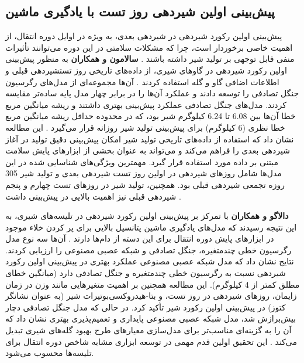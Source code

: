 \subsection*{پیش‌بینی اولین شیردهی روز تست  با یادگیری ماشین}	
پیش‌بینی اولین رکورد شیردهی در شیردهی بعدی، به ویژه در اوایل دوره انتقال، از اهمیت خاصی برخوردار است، چرا که مشکلات سلامتی در این دوره می‌توانند تأثیرات منفی قابل توجهی بر تولید شیر داشته باشند \cite{Dallago2019}.
	\textbf{سالامون و همکاران} به منظور پیش‌بینی اولین رکورد شیردهی در گاوهای شیری، از داده‌های تاریخی روز تستشیردهی قبلی  و اطلاعات اضافی گاو و گله استفاده کردند \cite{Salamone2022}.
آن‌ها مجموعه‌ای از مدل‌های رگرسیون جنگل تصادفی را توسعه دادند و عملکرد آن‌ها را در برابر چهار مدل پایه ساده‌تر مقایسه کردند. مدل‌های جنگل تصادفی عملکرد پیش‌بینی بهتری داشتند و ریشه میانگین مربع خطا آن‌ها بین \num{6,08} تا \num{6,24} کیلوگرم شیر بود، که در محدوده حداقل ریشه میانگین مربع خطا نظری (6 کیلوگرم) برای پیش‌بینی تولید شیر روزانه قرار می‌گیرد \cite{Salamone2022}. این مطالعه نشان داد که استفاده از داده‌های تاریخی تولید شیر امکان پیش‌بینی دقیق تولید در آغاز شیردهی بعدی را فراهم می‌کند و می‌تواند به عنوان بخشی از ابزارهای پایش سلامت مبتنی بر داده مورد استفاده قرار گیرد. مهمترین ویژگی‌های شناسایی شده در این مدل‌ها شامل روزهای شیردهی در اولین روز تست شیردهی بعدی و تولید شیر 305 روزه تجمعی شیردهی قبلی بود. همچنین، تولید شیر در روزهای تست چهارم و پنجم شیردهی قبلی نیز اهمیت بالایی در پیش‌بینی داشت \cite{Salamone2022}.
	
\textbf{دالاگو و همکاران} با تمرکز بر پیش‌بینی اولین رکورد شیردهی در تلیسه‌های شیری، به این نتیجه رسیدند که مدل‌های یادگیری ماشین پتانسیل بالایی برای پر کردن خلاء موجود در ابزارهای پایش دوره انتقال برای این دسته از دام‌ها دارند \cite{Dallago2019}.
آن‌ها سه نوع مدل رگرسیون خطی چندمتغیره، جنگل تصادفی و شبکه عصبی مصنوعی را ارزیابی کردند. نتایج نشان داد که مدل شبکه عصبی مصنوعی عملکرد بهتری در پیش‌بینی اولین رکورد شیردهی نسبت به رگرسیون خطی چند‌متغیره و جنگل تصادفی دارد (میانگین خطای مطلق کمتر از 4 کیلوگرم). 
این مطالعه همچنین بر اهمیت متغیرهایی مانند وزن در زمان زایمان، روزهای شیردهی در روز تست، و بتا-هیدروکسی‌بوتیرات شیر (به عنوان نشانگر کتوز) در پیش‌بینی اولین رکورد شیر تأکید کرد. در حالی که مدل جنگل تصادفی دچار بیش‌برازش شد، مدل شبکه عصبی مصنوعی پایداری و تعمیم‌پذیری بهتری نشان داد که آن را به گزینه‌ای مناسب‌تر برای مدل‌سازی معیارهای طرح بهبود گله‌های شیری تبدیل می‌کند \cite{Dallago2019}. این تحقیق اولین قدم مهمی در توسعه ابزاری مشابه شاخص دوره انتقال برای تلیسه‌ها محسوب می‌شود.
	
